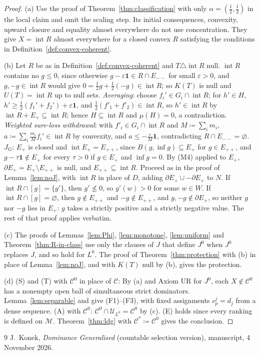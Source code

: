 \documentclass[11pt]{article}
\theoremstyle{definition}
\newcommand{\M}{\mathcal M}
\newcommand{\C}{\mathcal C}
\newcommand{\U}{\mathcal U}
\newcommand{\one}{\mathbf 1}
\newcommand{\interior}{\operatorname{int}}
\newcommand{\bd}{\partial}
\newcommand{\GU}{\mathrm{G}}
\begin{document}
\begin{proof}
(a) Use the proof of Theorem~\ref{thm:classification} with only $\alpha=(\tfrac12,\tfrac12)$ in the local claim and omit the scaling step. Its initial consequences, convexity, upward closure and equality almost everywhere do not use concentration. They give $X=\interior R$ almost everywhere for a closed convex $R$ satisfying the conditions in Definition~\ref{def:convex-coherent}.

(b) Let $R$ be as in Definition~\ref{def:convex-coherent} and $T\triangle\interior R$ null. $\interior R$ contains no $g\le0$, since otherwise $g-\varepsilon\one\in R\cap E_{--}$ for small $\varepsilon>0$, and $g,-g\in\interior R$ would give $0=\frac12g+\frac12(-g)\in\interior R$; so $K(T)$ is null and $U(T)=\interior R$ up to null sets. \emph{Averaging}: choose $f_i'\in G_i\cap\interior R$; for $h'\in H$, $h'\ge\frac12(f_1'+f_2')+\varepsilon\one$, and $\frac12(f'_1+f'_2)\in\interior R$, so $h'\in\interior R$ by $\interior R+E_+\subseteq\interior R$; hence $H\subseteq\interior R$ and $\mu(H)=0$, a contradiction. \emph{Weighted sure-loss withdrawal}: with $f'_i\in G_i\cap\interior R$ and $M\coloneqq\sum_im_i$, $a\coloneqq\sum_i\frac{m_i}{M}f_i'\in\interior R$ by convexity, and $a\le-\frac{\varepsilon}{M}\one$, contradicting $R\cap E_{--}=\varnothing$. \emph{$J_\GU$}: $E_+$ is closed and $\interior E_+=E_{++}$, since $B(g,\inf g)\subseteq E_+$ for $g\in E_{++}$, and $g-\tau\one\notin E_+$ for every $\tau>0$ if $g\in E_+$ and $\inf g=0$. By (M4) applied to $E_+$, $\bd E_+=E_+\setminus E_{++}$ is null, and $E_{++}\subseteq\interior R$. Proceed as in the proof of Lemma~\ref{lem:noJ}, with $\interior R$ in place of $D$, adding $\bd E_+\cup-\bd E_+$ to $N$. If $\interior R\cap[g]=\{g'\}$, then $g'\not\le0$, so $g'(w)>0$ for some $w\in W$. If $\interior R\cap[g]=\varnothing$, then $g\notin E_{++}$ and $-g\notin E_{++}$, and $g,-g\notin\bd E_+$, so neither $g$ nor $-g$ lies in $E_+$: $g$ takes a strictly positive and a strictly negative value. The rest of that proof applies verbatim.

(c) The proofs of Lemmas~\ref{lem:Phi}, \ref{lem:monotone}, \ref{lem:uniform} and Theorem~\ref{thm:R-in-class} use only the clauses of $J$ that define $J^0$ when $J^0$ replaces $J$, and so hold for $L^0$. The proof of Theorem~\ref{thm:protection} with (b) in place of Lemma~\ref{lem:noJ}, and with $K(T)$ null by (b), gives the protection.

(d) (S) and (T) with $\C^0$ in place of $\C$: By (a) and Axiom UR for $J^0$, each $X\notin\C^0$ has a nonempty open ball of simultaneous strict dominators. Lemma~\ref{lem:separable} and \cite[Corollary~2.7]{LDG} give (F1)--(F3), with fixed assignments $c^j_p=d_j$ from a dense sequence. (A) with $\C^0$: $\C^0\cap\U_{L^0}=\C^0$ by (c). (E) holds since every ranking is defined on $\M$. Theorem~\ref{thm:ldg} with $\C^\ast\coloneqq\C^0$ gives the conclusion.
\end{proof}

\begin{thebibliography}{9}
 J.~Konek, \emph{Dominance Generalised} (countable selection version), manuscript, 4 November 2026.
\end{thebibliography}
\end{document}

